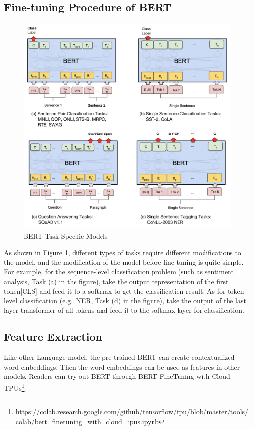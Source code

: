 \documentclass[]{krantz}
\renewcommand{\href}[2]{#2\footnote{\url{#1}}}
\begin{document}
\hypertarget{fine-tuning-procedure-of-bert}{%
\subsection{Fine-tuning Procedure of BERT}\label{fine-tuning-procedure-of-bert}}

\begin{figure}

{\centering \includegraphics[width=0.6\linewidth]{figures/02-03-transfer-learning-for-nlp/bert_based_model} 

}

\caption{BERT Task Specific Models}\label{fig:ch02-03-figure05}
\end{figure}

As shown in Figure \ref{fig:ch02-03-figure05}, different types of tasks require different modifications to the model, and the modification of the model before fine-tuning is quite simple. For example, for the sequence-level classification problem (such as sentiment analysis, Task (a) in the figure), take the output representation of the first token{[}CLS{]} and feed it to a softmax to get the classification result. As for token-level classification (e.g.~NER, Task (d) in the figure), take the output of the last layer transformer of all tokens and feed it to the softmax layer for classification.

\hypertarget{feature-extraction}{%
\subsection{Feature Extraction}\label{feature-extraction}}

Like other Language model, the pre-trained BERT can create contextualized word embeddings. Then the word embeddings can be used as features in other models. Readers can try out BERT through \href{https://colab.research.google.com/github/tensorflow/tpu/blob/master/tools/colab/bert_finetuning_with_cloud_tpus.ipynb}{BERT FineTuning with Cloud TPUs}.
\end{document}
